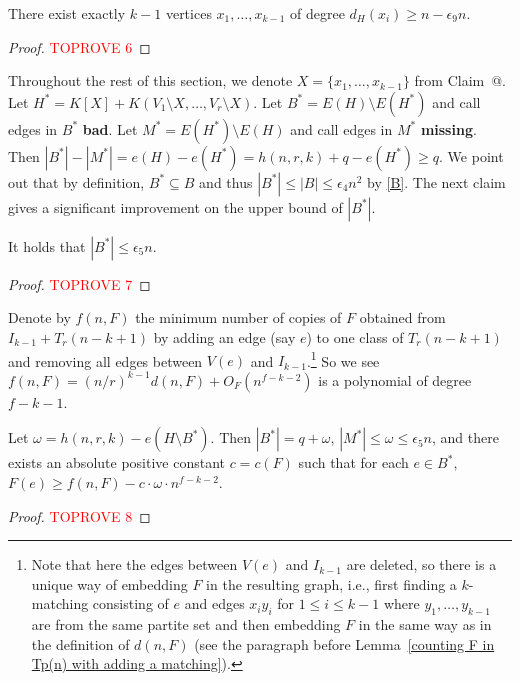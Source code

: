 \documentclass[10pt]{article}
\makeatletter
\newcommand*{\rom}[1]{\expandafter\@slowromancap\romannumeral #1@}
\makeatother
\begin{document}
\medskip


\noindent {\bf Claim \rom{1}.} There exist exactly $k-1$ vertices $x_1,\ldots, x_{k-1}$ of degree $d_H(x_i)\geq n-\epsilon_9n$.


\begin{proof}\textcolor{red}{TOPROVE 6}\end{proof}


Throughout the rest of this section, we denote $X=\{x_1,\ldots,x_{k-1}\}$ from Claim~\rom{1}.
Let $H^*=K[X]+K(V_1\setminus X,\ldots,V_r\setminus X).$
Let $B^*=E(H)\setminus E(H^*)$ and call edges in $B^*$ {\bf bad}.
Let $M^*=E(H^*)\setminus E(H)$ and call edges in $M^*$ {\bf missing}.
Then $|B^*|-|M^*|=e(H)-e(H^*)=h(n,r,k)+q-e(H^*)\geq q$.
We point out that by definition, $B^*\subseteq B$ and thus $|B^*|\leq |B|\leq \epsilon_4 n^2$ by \eqref{B}.
The next claim gives a significant improvement on the upper bound of $|B^*|$.

\medskip

\noindent {\bf Claim~\rom{2}.} It holds that $|B^\ast|\leq \epsilon_5 n$.

\begin{proof}\textcolor{red}{TOPROVE 7}\end{proof}

Denote by $f(n,F)$ the minimum number of copies of $F$ obtained from $I_{k-1}+ T_r(n-k+1)$ by adding an edge (say $e$) to one class of $T_r(n-k+1)$
and removing all edges between $V(e)$ and $I_{k-1}$.\footnote{Note that here the edges between $V(e)$ and $I_{k-1}$ are deleted,
so there is a unique way of embedding $F$ in the resulting graph, i.e., first finding a $k$-matching consisting of $e$ and edges $x_iy_i$ for $1\leq i\leq k-1$ where $y_1,\ldots,y_{k-1}$ are from the same partite set and then embedding $F$ in the same way as in the definition of $d(n,F)$ (see the paragraph before Lemma~\ref{counting F in Tp(n) with adding a matching}).}
So we see $f(n,F)=(n/r)^{k-1}d(n,F)+O_F(n^{f-k-2})$ is a polynomial of degree $f-k-1$.

\medskip


\noindent {\bf Claim~\rom{3}.} Let $\omega=h(n,r,k)-e(H\setminus B^\ast).$ Then $|B^*|=q+\omega$, $|M^*|\leq \omega\leq \epsilon_5 n$,
and there exists an absolute positive constant $c=c(F)$ such that for each $e\in B^*$, $F(e)\geq f(n,F)- c\cdot \omega\cdot n^{f-k-2}$.

\begin{proof}\textcolor{red}{TOPROVE 8}\end{proof}
\end{document}
